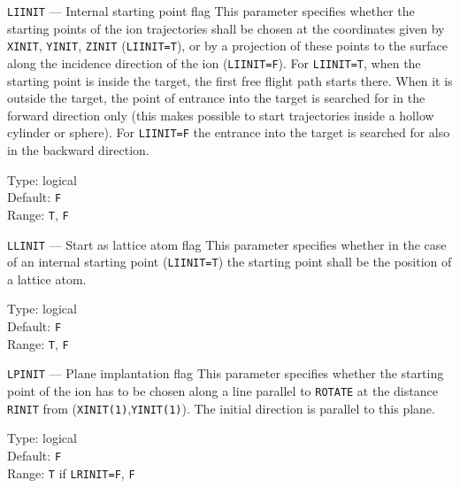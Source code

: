 \begin{keydescription}{\texttt{LIINIT} --- Internal starting point flag}
%
  This parameter specifies whether the starting points of the ion
  trajectories shall be chosen at the coordinates given by \texttt{XINIT},
  \texttt{YINIT}, \texttt{ZINIT} ({\tt LIINIT=T}), or by a projection of 
  these points to the surface along the incidence direction of the ion 
  ({\tt LIINIT=F}).  For \texttt{LIINIT=T}, when the starting point is inside
  the target, the first free flight path starts there. When it is outside 
  the target, the point of entrance into the target is searched for in the 
  forward direction only (this makes possible to start trajectories inside a 
  hollow cylinder or sphere). For \texttt{LIINIT=F} the entrance into the 
  target is searched for also in the backward direction.
%
  \begin{keytab}
    Type:    \> logical \\
    Default: \> \texttt{F} \\
    Range:   \> \texttt{T}, \texttt{F}
  \end{keytab}
\end{keydescription}

\begin{keydescription}{\texttt{LLINIT} --- Start as lattice atom flag}
%
  This parameter specifies whether in the case of an internal starting
  point (\texttt{LIINIT=T}) the starting point shall be the position
  of a lattice atom.
%
  \begin{keytab}
    Type:    \> logical \\
    Default: \> \texttt{F} \\
    Range:   \> \texttt{T}, \texttt{F}
  \end{keytab}
\end{keydescription}

\ifprivate
\begin{keydescription}{\texttt{LPINIT} --- Plane implantation flag}
%
  This parameter specifies whether the starting point of the ion has to
  be chosen along a line parallel to \texttt{ROTATE} at the distance
  \texttt{RINIT} from (\texttt{XINIT(1)},\texttt{YINIT(1)}). The initial
  direction is parallel to this plane.
%
  \begin{keytab}
    Type:    \> logical \\
    Default: \> \texttt{F} \\
    Range:   \> \texttt{T} if \texttt{LRINIT=F}, \texttt{F}
  \end{keytab}
\end{keydescription}
\fi

